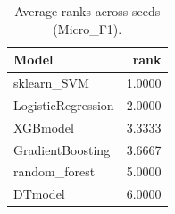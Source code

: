 \begin{table}[t]
\centering
\begin{tabular}{lr}
\toprule
Model & rank \\
\midrule
sklearn_SVM & 1.0000 \\
LogisticRegression & 2.0000 \\
XGBmodel & 3.3333 \\
GradientBoosting & 3.6667 \\
random_forest & 5.0000 \\
DTmodel & 6.0000 \\
\bottomrule
\end{tabular}
\caption{Average ranks across seeds (Micro_F1).}
\label{tab:avg_rank_Micro_F1}
\end{table}